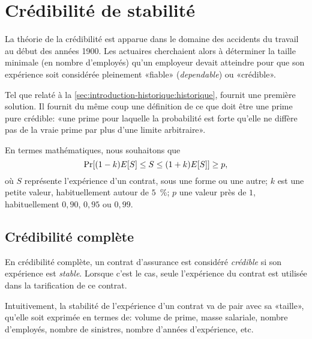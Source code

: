 
\chapter{Crédibilité de stabilité}
\label{chap:stabilite}

La théorie de la crédibilité est apparue dans le domaine des accidents
du travail au début des années 1900. Les actuaires cherchaient alors à
déterminer la taille minimale (en nombre d'employés) qu'un employeur
devait atteindre pour que son expérience soit considérée pleinement
«fiable» (\emph{dependable}) ou «crédible».

Tel que relaté à la \autoref{sec:introduction-historique:historique},
\cite{Mowbray:1914} fournit une première solution. Il fournit du même
coup une définition de ce que doit être une prime pure crédible: «une
prime pour laquelle la probabilité est forte qu'elle ne diffère pas de
la vraie prime par plus d'une limite arbitraire».

En termes mathématiques, nous souhaitons que
\begin{displaymath}
  \Pr[(1 - k) E [ S ] \leq S \leq (1 + k) E [ S ]] \geq p,
\end{displaymath}
où $S$ représente l'expérience d'un contrat, sous une forme ou une
autre; $k$ est une petite valeur, habituellement autour de $5$~\%; $p$
une valeur près de $1$, habituellement $0,90$, $0,95$ ou $0,99$.


\section{Crédibilité complète}
\label{sec:stabilite:complete}

En crédibilité complète, un contrat d'assurance est considéré
\emph{crédible} si son expérience est \emph{stable}. Lorsque c'est le
cas, seule l'expérience du contrat est utilisée dans la tarification
de ce contrat.


Intuitivement, la stabilité de l'expérience d'un contrat va de pair
avec sa «taille», qu'elle soit exprimée en termes de: volume de prime,
masse salariale, nombre d'employés, nombre de sinistres, nombre
d'années d'expérience, etc.


